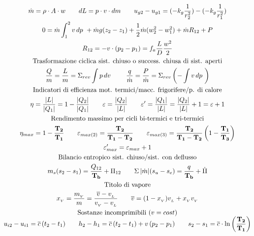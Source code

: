 \documentclass[9pt]{article}
\begin{document}
\begin{multicols}{2}
	
	\begin{gather*}
		\dot{m}=\rho \cdot A \cdot w \qquad dL = p \cdot v \cdot dm \qquad u_{g2}-u_{g1} = (-k_g \frac{1}{r_2^2})-(-k_g \frac{1}{r_1^2})\\
		0 = \dot{m} \int_{1}^{2} v \, dp\ + \dot{m}g(z_2-z_1)+\frac{1}{2} \dot{m} (w_2^2-w_1^2) + \dot{m} R_{12} + P \\
		R_{12} = -v \cdot (p_2 - p_1) = f_a \frac{L}{D} \frac{w^2}{2} \\
		\text{Trasformazione ciclica sist. chiuso o success. chiusa di sist. aperti}\\
		\frac{Q}{m} = \frac{L}{m} = \Sigma_{rev} \int p \,dv\ \qquad \frac{q}{\dot{m}} = \frac{P}{\dot{m}} = \Sigma_{rev} \left( - \int v \,dp\ \right)\\
		\text{Indicatori di efficienza mot. termici/macc. frigorifere/p. di calore}\\
		\eta = \frac{|L|}{|Q_1|}=1-\frac{|Q_2|}{|Q_1|} \qquad \varepsilon = \frac{|Q_2|}{|L|} \qquad \varepsilon ' = \frac{|Q_1|}{|L|} = \frac{|Q_2|}{|L|} +1 = \varepsilon +1\\
		\text{Rendimento massimo per cicli bi-termici e tri-termici}\\
		\eta_{max} = 1-\frac{\mathbf{T_2}}{\mathbf{T_1}} \qquad \varepsilon_{max(2)} = \frac{\mathbf{T_2}}{\mathbf{T_1}-\mathbf{T_2}} \qquad \varepsilon_{max(3)} = \frac{\mathbf{T_2}}{\mathbf{T_1} - \mathbf{T_2}}\left(1-\frac{\mathbf{T_1}}{\mathbf{T_3}}\right)\\ \varepsilon'_{max} = \varepsilon_{max} + 1 \\
		\text{Bilancio entropico sist. chiuso/sist. con deflusso}\\
		m_s(s_2-s_1) = \frac{Q_{12}}{\mathbf{T_b}} + \Pi_{12} \qquad \Sigma \, |\dot{m}| (s_u - s_e) = \frac{q}{\mathbf{T_b}} + \dot{\Pi}\\
		\text{Titolo di vapore}\\
		x_{_V} = \frac{m_{_V}}{m} = \frac{\overline{v} - v_{_L}}{v_{_V} - v_{_L}} \qquad \overline{v}  = (1-x_{_V})v_{_L}+ x_{_V} v_{_V}\\
		\text{Sostanze incomprimibili } (v=cost)\\[-5pt]
		\vspace{-5mm}
		u_{i2}-u_{i1} = \overline{c}\,(t_2-t_1)
		\qquad h_2-h_1= \overline{c}\,(t_2-t_1) + v\,(p_2-p_1) 
		\qquad s_2 - s_1 = \overline{c}\cdot \ln\left(\frac{\mathbf{T_2}}{\mathbf{T_1}}\right)
		\\

\end{gather*}
\end{multicols}
\end{document}
